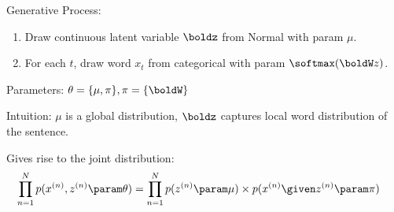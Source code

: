 \begin{frame}
\vspace{0.25cm}

Generative Process:
\begin{enumerate}
    \item Draw continuous latent variable $\boldz$ from Normal with param $\mu$.
    \item For each $t$, draw word $x_t$ from categorical with param $\softmax(\boldW z)$.
\end{enumerate}
\air

Parameters: $\theta= \{\mu, \pi\}, \pi = \{ \boldW \}$

\air

Intuition: $\mu$ is a global distribution, $\boldz$ captures local word distribution of the sentence. 
\end{frame}

\begin{frame}

\begin{center}

\end{center}

\air
\air

Gives rise to the joint distribution:
\begin{align*}
     \prod_{n=1}^N p(x^{(n)}, z^{(n)} \param \theta) &= \prod_{n=1}^N p(z^{(n)} \param \mu) \times p(x^{(n)} \given z^{(n)} \param \pi ) %
     \end{align*}
\end{frame}


